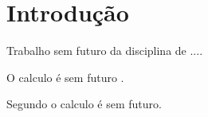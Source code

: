 


\chapter{Introdução}
\label{cha:intro}

Trabalho sem futuro da disciplina de ....

O calculo é sem futuro \cite{daniels2006review}.

Segundo \cite{sampaio2021investigaccao} o calculo é sem futuro.

%
%

